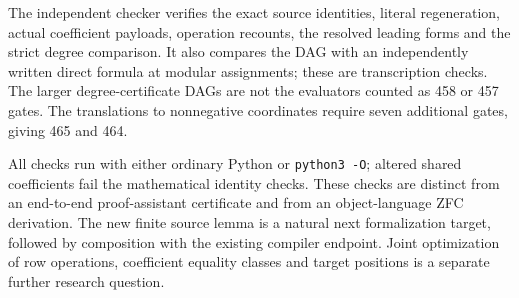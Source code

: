 The independent checker verifies the exact source identities, literal
regeneration, actual coefficient payloads, operation recounts, the resolved
leading forms and the strict degree comparison. It also compares the DAG
with an independently written direct formula at modular assignments;
these are transcription checks. The larger degree-certificate DAGs are not
the evaluators counted as 458 or 457 gates. The translations to nonnegative
coordinates require seven additional gates, giving 465 and 464.

All checks run with either ordinary Python or \texttt{python3 -O}; altered
shared coefficients fail the mathematical identity checks. These checks
are distinct from an end-to-end proof-assistant certificate and from an
object-language ZFC derivation. The new finite source lemma is a natural
next formalization target, followed by composition with the existing
compiler endpoint. Joint optimization of row operations, coefficient
equality classes and target positions is a separate further research
question.
